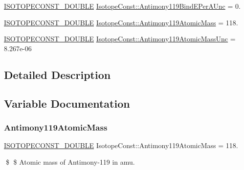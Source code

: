 \begin{DoxyCompactItemize}
\mbox{\hyperlink{group___isotope_const-_macros_ga8f45a7272ce02c0b4c65c44636ed719a}{I\+S\+O\+T\+O\+P\+E\+C\+O\+N\+S\+T\+\_\+\+D\+O\+U\+B\+LE}} \mbox{\hyperlink{group___isotope_const-_antimony-_sb119_ga7f567fa45783d68c549a992948804d4e}{Isotope\+Const\+::\+Antimony119\+Bind\+E\+Per\+A\+Unc}} = 0.
\item 
\mbox{\hyperlink{group___isotope_const-_macros_ga8f45a7272ce02c0b4c65c44636ed719a}{I\+S\+O\+T\+O\+P\+E\+C\+O\+N\+S\+T\+\_\+\+D\+O\+U\+B\+LE}} \mbox{\hyperlink{group___isotope_const-_antimony-_sb119_ga779700e028c56a7714ad4be71ee1820c}{Isotope\+Const\+::\+Antimony119\+Atomic\+Mass}} = 118.
\item 
\mbox{\hyperlink{group___isotope_const-_macros_ga8f45a7272ce02c0b4c65c44636ed719a}{I\+S\+O\+T\+O\+P\+E\+C\+O\+N\+S\+T\+\_\+\+D\+O\+U\+B\+LE}} \mbox{\hyperlink{group___isotope_const-_antimony-_sb119_ga5b8a04e493fcc63c789bb57f42e62ae1}{Isotope\+Const\+::\+Antimony119\+Atomic\+Mass\+Unc}} = 8.\+267e-\/06
\end{DoxyCompactItemize}


\subsection{Detailed Description}


\subsection{Variable Documentation}
\mbox{\label{group___isotope_const-_antimony-_sb119_ga779700e028c56a7714ad4be71ee1820c}} 
\subsubsection{\texorpdfstring{Antimony119\+Atomic\+Mass}{Antimony119AtomicMass}}
{\footnotesize\ttfamily \mbox{\hyperlink{group___isotope_const-_macros_ga8f45a7272ce02c0b4c65c44636ed719a}{I\+S\+O\+T\+O\+P\+E\+C\+O\+N\+S\+T\+\_\+\+D\+O\+U\+B\+LE}} Isotope\+Const\+::\+Antimony119\+Atomic\+Mass = 118.}

\$ \$ Atomic mass of Antimony-\/119 in amu. \mbox{\label{group___isotope_const-_antimony-_sb119_ga5b8a04e493fcc63c789bb57f42e62ae1}} 
